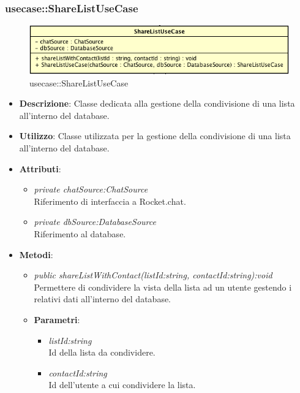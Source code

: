 \subsubsection{usecase::ShareListUseCase}

\label{usecase::ShareListUseCase}
\begin{figure}[ht]
	\centering
	\includegraphics[scale=0.5]{Sezioni/SottosezioniST/img/app/ShareListUseCase.png}
	\caption{usecase::ShareListUseCase}
\end{figure}

\begin{itemize}
\item \textbf{Descrizione}: Classe dedicata alla gestione della condivisione di una lista all'interno del database.
\item \textbf{Utilizzo}: Classe utilizzata per la gestione della condivisione di una lista all'interno del database.
\item \textbf{Attributi}: 
\begin{itemize}
\item \textit{private chatSource:ChatSource}\\
	Riferimento di interfaccia a Rocket.chat.
\item \textit{private dbSource:DatabaseSource}\\
	Riferimento al database.
\end{itemize}
\item \textbf{Metodi}:
\begin{itemize}
\item \textit{public shareListWithContact(listId:string, contactId:string):void}\\
	Permettere di condividere la vista della lista ad un utente gestendo i relativi dati all'interno del database.
	\item{\textbf{Parametri}: \begin{itemize}
	\item \textit{listId:string}\\
	Id della lista da condividere.
	\item \textit{contactId:string}\\
	Id dell'utente a cui condividere la lista.
	\end{itemize}}

\end{itemize}
\end{itemize}
